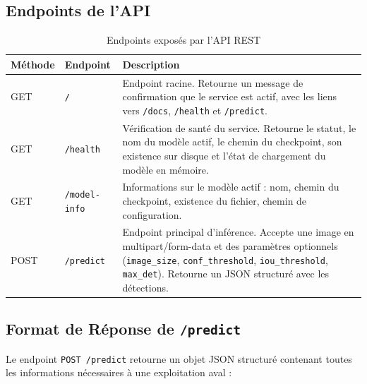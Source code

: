 \documentclass{rapportENSIAS}
\begin{document}
\subsection{Endpoints de l'API}

\begin{table}[H]
\centering
\caption{Endpoints exposés par l'API REST}
\label{tab:api_endpoints}
\begin{tabular}{p{1.5cm} p{3cm} p{9.5cm}}
\toprule
\textbf{Méthode} & \textbf{Endpoint} & \textbf{Description} \\
\midrule
GET & \texttt{/}
  & Endpoint racine. Retourne un message de confirmation que le service
    est actif, avec les liens vers \texttt{/docs}, \texttt{/health}
    et \texttt{/predict}. \\
\midrule
GET & \texttt{/health}
  & Vérification de santé du service. Retourne le statut, le nom du modèle
    actif, le chemin du checkpoint, son existence sur disque et l'état
    de chargement du modèle en mémoire. \\
\midrule
GET & \texttt{/model-info}
  & Informations sur le modèle actif : nom, chemin du checkpoint,
    existence du fichier, chemin de configuration. \\
\midrule
POST & \texttt{/predict}
  & Endpoint principal d'inférence. Accepte une image en multipart/form-data
    et des paramètres optionnels (\texttt{image\_size}, \texttt{conf\_threshold},
    \texttt{iou\_threshold}, \texttt{max\_det}). Retourne un JSON structuré
    avec les détections. \\
\bottomrule
\end{tabular}
\end{table}

\subsection{Format de Réponse de \texttt{/predict}}

Le endpoint \texttt{POST /predict} retourne un objet JSON structuré contenant
toutes les informations nécessaires à une exploitation aval :
\end{document}
